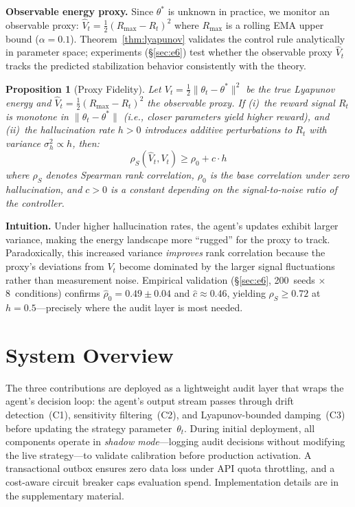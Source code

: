 \documentclass{article}
\newtheorem{proposition}{Proposition}
\begin{document}
\textbf{Observable energy proxy.} Since $\theta^*$ is unknown in
practice, we monitor an observable proxy:
$\hat{V}_t = \tfrac{1}{2}(R_{\max} - R_t)^2$
where $R_{\max}$ is a rolling EMA upper bound ($\alpha = 0.1$).
Theorem~\ref{thm:lyapunov} validates the control rule analytically
in parameter space; experiments (\S\ref{sec:e6}) test whether the
observable proxy $\hat{V}_t$ tracks the predicted stabilization
behavior consistently with the theory.

\begin{proposition}[Proxy Fidelity]
\label{prop:proxy-fidelity}
Let $V_t = \frac{1}{2}\|\theta_t - \theta^*\|^2$ be the true Lyapunov
energy and $\hat{V}_t = \frac{1}{2}(R_{\max} - R_t)^2$ the observable
proxy. If (i)~the reward signal $R_t$ is monotone in
$\|\theta_t - \theta^*\|$ (i.e., closer parameters yield higher
reward), and (ii)~the hallucination rate $h > 0$ introduces additive
perturbations to $R_t$ with variance $\sigma_h^2 \propto h$, then:
\begin{equation}
  \rho_S(\hat{V}_t, V_t) \geq \rho_0 + c \cdot h
  \label{eq:proxy-bound}
\end{equation}
where $\rho_S$ denotes Spearman rank correlation, $\rho_0$ is the
base correlation under zero hallucination, and $c > 0$ is a constant
depending on the signal-to-noise ratio of the controller.
\end{proposition}

\textbf{Intuition.} Under higher hallucination rates, the agent's
updates exhibit larger variance, making the energy landscape more
``rugged'' for the proxy to track. Paradoxically, this increased
variance \emph{improves} rank correlation because the proxy's
deviations from $V_t$ become dominated by the larger signal
fluctuations rather than measurement noise.
Empirical validation (\S\ref{sec:e6}, 200~seeds $\times$ 8~conditions)
confirms $\hat{\rho}_0 = 0.49 \pm 0.04$ and $\hat{c} \approx 0.46$,
yielding $\rho_S \geq 0.72$ at $h{=}0.5$---precisely where the audit
layer is most needed.

\section{System Overview}
\label{sec:system}

The three contributions are deployed as a lightweight audit layer
that wraps the agent's decision loop: the agent's output stream
passes through drift detection~(C1), sensitivity filtering~(C2),
and Lyapunov-bounded damping~(C3) before updating the strategy
parameter~$\theta_t$. During initial deployment, all components
operate in \emph{shadow mode}---logging audit decisions without
modifying the live strategy---to validate calibration before
production activation.
A transactional outbox ensures zero data loss under API quota
throttling, and a cost-aware circuit breaker caps evaluation spend.
Implementation details are in the supplementary material.
\end{document}
